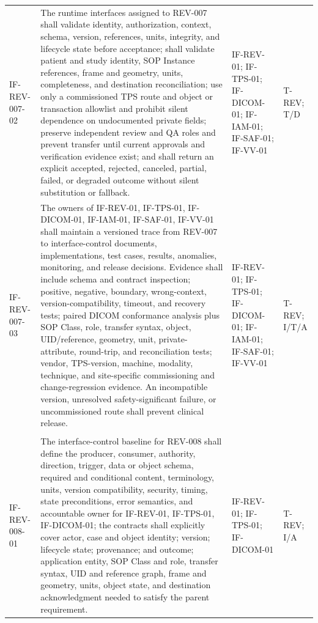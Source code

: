 \documentclass[11pt,letterpaper]{article}
\begin{document}
\begin{scriptsize}
\begin{longtable}{@{}L{0.14\textwidth}L{0.49\textwidth}L{0.19\textwidth}L{0.10\textwidth}@{}}
\addlinespace[2pt]
\mbox{IF-REV-007-02} & The runtime interfaces assigned to REV-007 shall validate identity, authorization, context, schema, version, references, units, integrity, and lifecycle state before acceptance; shall validate patient and study identity, SOP Instance references, frame and geometry, units, completeness, and destination reconciliation; use only a commissioned TPS route and object or transaction allowlist and prohibit silent dependence on undocumented private fields; preserve independent review and QA roles and prevent transfer until current approvals and verification evidence exist; and shall return an explicit accepted, rejected, canceled, partial, failed, or degraded outcome without silent substitution or fallback. & IF-REV-01; IF-TPS-01; IF-DICOM-01; IF-IAM-01; IF-SAF-01; IF-VV-01 & T-REV; T\slash\allowbreak{}D \\
\addlinespace[2pt]
\mbox{IF-REV-007-03} & The owners of IF-REV-01, IF-TPS-01, IF-DICOM-01, IF-IAM-01, IF-SAF-01, IF-VV-01 shall maintain a versioned trace from REV-007 to interface-control documents, implementations, test cases, results, anomalies, monitoring, and release decisions. Evidence shall include schema and contract inspection; positive, negative, boundary, wrong-context, version-compatibility, timeout, and recovery tests; paired DICOM conformance analysis plus SOP Class, role, transfer syntax, object, UID\slash\allowbreak{}reference, geometry, unit, private-attribute, round-trip, and reconciliation tests; vendor, TPS-version, machine, modality, technique, and site-specific commissioning and change-regression evidence. An incompatible version, unresolved safety-significant failure, or uncommissioned route shall prevent clinical release. & IF-REV-01; IF-TPS-01; IF-DICOM-01; IF-IAM-01; IF-SAF-01; IF-VV-01 & T-REV; I\slash\allowbreak{}T\slash\allowbreak{}A \\
\addlinespace[2pt]
 \\
\addlinespace[2pt]
\mbox{IF-REV-008-01} & The interface-control baseline for REV-008 shall define the producer, consumer, authority, direction, trigger, data or object schema, required and conditional content, terminology, units, version compatibility, security, timing, state preconditions, error semantics, and accountable owner for IF-REV-01, IF-TPS-01, IF-DICOM-01; the contracts shall explicitly cover actor, case and object identity; version; lifecycle state; provenance; and outcome; application entity, SOP Class and role, transfer syntax, UID and reference graph, frame and geometry, units, object state, and destination acknowledgment needed to satisfy the parent requirement. & IF-REV-01; IF-TPS-01; IF-DICOM-01 & T-REV; I\slash\allowbreak{}A \\

\end{longtable}
\end{scriptsize}
\end{document}
